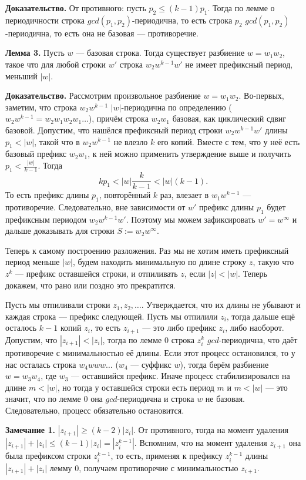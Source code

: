 \textbf{Доказательство.} От противного: пусть $p_2 \le (k-1)p_1$.
Тогда по лемме о периодичности строка $gcd(p_1, p_2)$-периодична, то есть строка $p_2$ $gcd(p_1,p_2)$-периодична, то есть она не базовая --- противоречие.

\textbf{Лемма 3.} Пусть $w$ --- базовая строка. Тогда существует разбиение $w = w_1w_2$, такое что для любой строки $w'$ строка $w_2 w^{k-1}w'$ не имеет префиксный период, меньший $|w|$.

\textbf{Доказательство.} Рассмотрим произвольное разбиение $w = w_1 w_2$.
\sloppy Во-первых, заметим, что строка $w_2 w^{k-1}$ $|w|$-периодична по определению ($w_2 w^{k-1} = w_2w_1w_2w_1 \dots$), причём строка $w_2w_1$ базовая, как циклический сдвиг базовой.
Допустим, что нашёлся префиксный период строки $w_2 w^{k-1} w'$ длины $p_1 < |w|$, такой что в $w_2 w^{k-1}$ не влезло $k$ его копий.
Вместе с тем, что у неё есть базовый префикс $w_2 w_1$, к ней можно применить утверждение выше и получить $p_1 < \frac{|w|}{k-1}$. Тогда
\[
    kp_1 < |w| \frac{k}{k-1} < |w|(k - 1).
\]
То есть префикс длины $p_1$, повторённый $k$ раз, влезает в $w_1 w^{k-1}$ --- противоречие.
Следовательно, вне зависимости от $w'$ префикс длины $p_1$ будет префиксным периодом $w_2 w^{k-1} w'$.
Поэтому мы можем зафиксировать $w' = w^\infty$ и дальше доказывать для строки $S := w_2 w^{\infty}$.

Теперь к самому построению разложения.
Раз мы не хотим иметь префиксный период меньше $|w|$, будем находить минимальную по длине строку $z$, такую что $z^k$ --- префикс оставшейся строки, и отпиливать $z$, если $|z| < |w|$.
Теперь докажем, что рано или поздно это прекратится.

Пусть мы отпиливали строки $z_1, z_2, \dots$.
Утверждается, что их длины не убывают и каждая строка --- префикс следующей.
Пусть мы отпилили $z_i$, тогда дальше ещё осталось $k - 1$ копий $z_i$, то есть $z_{i+1}$ --- это либо префикс $z_i$, либо наоборот.
Допустим, что $|z_{i+1}| < |z_i|$, тогда по лемме 0 строка $z_i^k$ $gcd$-периодична, что даёт противоречие с минимальностью её длины.
Если этот процесс остановился, то у нас осталась строка $w_4www\dots$ ($w_4$ --- суффикс $w$), тогда берём разбиение $w = w_3w_4$, где $w_3$ --- оставшийся префикс.
Иначе процесс стабилизировался на длине $m < |w|$, но тогда у оставшейся строки есть период $m$ и $m < |w|$ --- это значит, что по лемме 0 она $gcd$-периодична и строка $w$ не базовая.
Следовательно, процесс обязательно остановится.

\textbf{Замечание 1.} $|z_{i+1}| \ge (k - 2)|z_i|$. 
От противного, тогда на момент удаления $|z_{i+1}| + |z_i| \le (k - 1)|z_i| = |z_i^{k-1}|$.
Вспомним, что на момент удаления $z_{i+1}$ она была префиксом строки $z_i^{k-1}$, то есть, применяя к префиксу $z_i^{k-1}$ длины $|z_{i+1}| + |z_i|$ лемму 0, получаем противоречие с минимальностью $z_{i+1}$.

